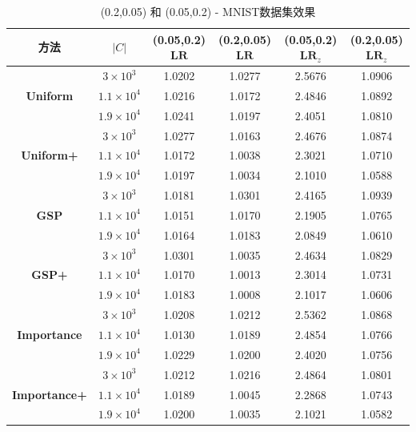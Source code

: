 \begin{table}[h!]
  \centering
  \caption{(0.2,0.05) 和 (0.05,0.2) - MNIST数据集效果}
  \begin{tabular}{|c|c|c|c|c|c|}
  \hline
  \textbf{方法} & $|C|$ & \textbf{(0.05,0.2) $\mathbf{LR}$} & \textbf{(0.2,0.05) $\mathbf{LR}$} & \textbf{(0.05,0.2) $\mathbf{LR}_z$} & \textbf{(0.2,0.05) $\mathbf{LR}_z$} \\
  \hline
  \multirow{3}{*}{\textbf{Uniform}} 
    & $3 \times 10^3$  & 1.0202 & 1.0277 & 2.5676 & 1.0906 \\
  \cline{2-6}
    & $1.1 \times 10^4$ & 1.0216 & 1.0172 & 2.4846 & 1.0892 \\
  \cline{2-6}
    & $1.9 \times 10^4$ & 1.0241 & 1.0197 & 2.4051 & 1.0810 \\
  \hline
  \multirow{3}{*}{\textbf{Uniform+}} 
    & $3 \times 10^3$  & 1.0277 & 1.0163 & 2.4676 & 1.0874 \\
  \cline{2-6}
    & $1.1 \times 10^4$ & 1.0172 & 1.0038 & 2.3021 & 1.0710 \\
  \cline{2-6}
    & $1.9 \times 10^4$ & 1.0197 & 1.0034 & 2.1010 & 1.0588 \\
  \hline
  \multirow{3}{*}{\textbf{GSP}}      
    & $3 \times 10^3$  & 1.0181 & 1.0301 & 2.4165 & 1.0939 \\
  \cline{2-6}
    & $1.1 \times 10^4$ & 1.0151 & 1.0170 & 2.1905 & 1.0765 \\
  \cline{2-6}
    & $1.9 \times 10^4$ & 1.0164 & 1.0183 & 2.0849 & 1.0610 \\
  \hline
  \multirow{3}{*}{\textbf{GSP+}}     
    & $3 \times 10^3$  & 1.0301 & 1.0035 & 2.4634 & 1.0829 \\
  \cline{2-6}
    & $1.1 \times 10^4$ & 1.0170 & 1.0013 & 2.3014 & 1.0731 \\
  \cline{2-6}
    & $1.9 \times 10^4$ & 1.0183 & 1.0008 & 2.1017 & 1.0606 \\
  \hline
  \multirow{3}{*}{\textbf{Importance}} 
    & $3 \times 10^3$  & 1.0208 & 1.0212 & 2.5362 & 1.0868 \\
  \cline{2-6}
    & $1.1 \times 10^4$ & 1.0130 & 1.0189 & 2.4854 & 1.0766 \\
  \cline{2-6}
    & $1.9 \times 10^4$ & 1.0229 & 1.0200 & 2.4020 & 1.0756 \\
  \hline
  \multirow{3}{*}{\textbf{Importance+}} 
    & $3 \times 10^3$  & 1.0212 & 1.0216 & 2.4864 & 1.0801 \\
  \cline{2-6}
    & $1.1 \times 10^4$ & 1.0189 & 1.0045 & 2.2868 & 1.0743 \\
  \cline{2-6}
    & $1.9 \times 10^4$ & 1.0200 & 1.0035 & 2.1021 & 1.0582 \\
  \hline
  \end{tabular}
  \label{tab:mnist_combined}
\end{table}



